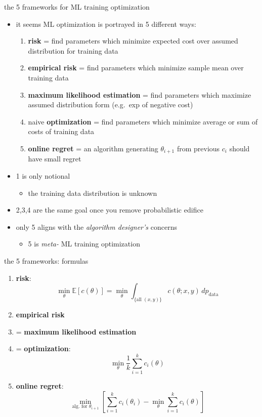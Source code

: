 \documentclass[xcolor={svgnames},
               hyperref={colorlinks,citecolor=DeepPink4,linkcolor=FireBrick,urlcolor=Maroon}]
               {beamer}
\newcommand{\EE}{\mathbb{E}}
\begin{document}
\begin{frame}{the 5 frameworks for ML training optimization}

\begin{itemize}
\item it seems ML optimization is portrayed in 5 different ways:

\medskip
    \begin{enumerate}
    \item[1.] \textbf{risk} = find parameters which minimize expected cost over assumed distribution for training data
    \item[2.] \textbf{empirical risk} = find parameters which minimize sample mean over training data
    \item[3.] \textbf{maximum likelihood estimation} = find parameters which maximize assumed distribution form (e.g.~exp of negative cost)
    \item[4.] naive \textbf{optimization} = find parameters which minimize average or sum of costs of training data
    \item[5.] \textbf{online regret} = an algorithm generating $\theta_{i+1}$ from previous $c_i$ should have small regret
    \end{enumerate}

\bigskip
\item 1 is only notional
    \begin{itemize}
    \item[$-$] the training data distribution is unknown
    \end{itemize}
\item 2,3,4 are the same goal once you remove probabilistic edifice
\item only 5 aligns with the \emph{algorithm designer's} concerns
    \begin{itemize}
    \item[$-$] 5 is \emph{meta-} ML training optimization
    \end{itemize}
\end{itemize}
\end{frame}


\begin{frame}{the 5 frameworks: formulas}

\begin{enumerate}
\item[1.] \textbf{risk}:
    $$\min_\theta \EE[c(\theta)] = \min_\theta \int_{\{\text{all } (x,y)\}} c(\theta;x,y)\,dp_{\text{data}}$$
\item[2.] \textbf{empirical risk}
\item[3.] = \textbf{maximum likelihood estimation}
\item[4.] = \textbf{optimization}:
    $$\min_\theta \frac{1}{k} \sum_{i=1}^k c_i(\theta)$$
\item[5.] \textbf{online regret}:
    $$\min_{\text{alg.~for } \theta_{i+1}} \left[\sum_{i=1}^k c_i(\theta_i) - \min_\theta \sum_{i=1}^k c_i(\theta)\right]$$
\end{enumerate}
\end{frame}
\end{document}
